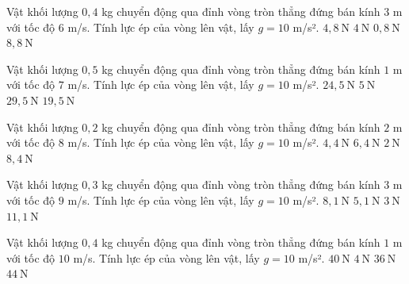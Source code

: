\begin{ex}
Vật khối lượng $0,4$ kg chuyển động qua đỉnh vòng tròn thẳng đứng bán kính $3$ m với tốc độ $6$ m/s. Tính lực ép của vòng lên vật, lấy $g=10$ m/s².
\choice
{$4,8\ \mathrm{N}$}
{$4\ \mathrm{N}$}
{\True $0,8\ \mathrm{N}$}
{$8,8\ \mathrm{N}$}
\end{ex}

\begin{ex}
Vật khối lượng $0,5$ kg chuyển động qua đỉnh vòng tròn thẳng đứng bán kính $1$ m với tốc độ $7$ m/s. Tính lực ép của vòng lên vật, lấy $g=10$ m/s².
\choice
{$24,5\ \mathrm{N}$}
{$5\ \mathrm{N}$}
{$29,5\ \mathrm{N}$}
{\True $19,5\ \mathrm{N}$}
\end{ex}

\begin{ex}
Vật khối lượng $0,2$ kg chuyển động qua đỉnh vòng tròn thẳng đứng bán kính $2$ m với tốc độ $8$ m/s. Tính lực ép của vòng lên vật, lấy $g=10$ m/s².
\choice
{\True $4,4\ \mathrm{N}$}
{$6,4\ \mathrm{N}$}
{$2\ \mathrm{N}$}
{$8,4\ \mathrm{N}$}
\end{ex}

\begin{ex}
Vật khối lượng $0,3$ kg chuyển động qua đỉnh vòng tròn thẳng đứng bán kính $3$ m với tốc độ $9$ m/s. Tính lực ép của vòng lên vật, lấy $g=10$ m/s².
\choice
{$8,1\ \mathrm{N}$}
{\True $5,1\ \mathrm{N}$}
{$3\ \mathrm{N}$}
{$11,1\ \mathrm{N}$}
\end{ex}

\begin{ex}
Vật khối lượng $0,4$ kg chuyển động qua đỉnh vòng tròn thẳng đứng bán kính $1$ m với tốc độ $10$ m/s. Tính lực ép của vòng lên vật, lấy $g=10$ m/s².
\choice
{$40\ \mathrm{N}$}
{$4\ \mathrm{N}$}
{\True $36\ \mathrm{N}$}
{$44\ \mathrm{N}$}
\end{ex}

